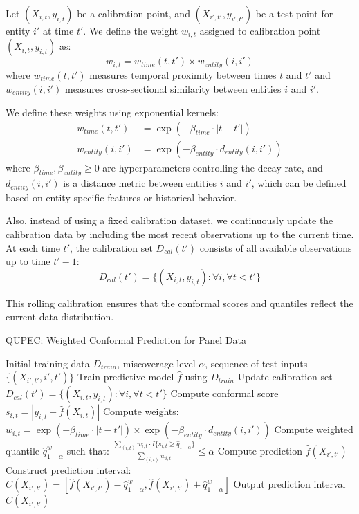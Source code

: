 Let $(X_{i,t}, y_{i,t})$ be a calibration point, and $(X_{i',t'}, y_{i',t'})$ be a test point for entity $i'$ at time $t'$. We define the weight $w_{i,t}$ assigned to calibration point $(X_{i,t}, y_{i,t})$ as:
$$w_{i,t} = w_{time}(t, t') \times w_{entity}(i, i')$$
where $w_{time}(t, t')$ measures temporal proximity between times $t$ and $t'$ and $w_{entity}(i, i')$ measures cross-sectional similarity between entities $i$ and $i'$.

We define these weights using exponential kernels:
\begin{align}
w_{time}(t, t') &= \exp(-\beta_{time} \cdot |t - t'|) \\
w_{entity}(i, i') &= \exp(-\beta_{entity} \cdot d_{entity}(i, i'))
\end{align}
where $\beta_{time}, \beta_{entity} \geq 0$ are hyperparameters controlling the decay rate, and $d_{entity}(i, i')$ is a distance metric between entities $i$ and $i'$, which can be defined based on entity-specific features or historical behavior.

Also, instead of using a fixed calibration dataset, we continuously update the calibration data by including the most recent observations up to the current time. At each time $t'$, the calibration set $D_{cal}(t')$ consists of all available observations up to time $t' - 1$:
$$D_{cal}(t') = \{(X_{i,t}, y_{i,t}) : \forall i, \forall t < t'\}$$

This rolling calibration ensures that the conformal scores and quantiles reflect the current data distribution.

\begin{algorithm}
\caption{QUPEC: Weighted Conformal Prediction for Panel Data}
\begin{algorithmic}[1]
\Require Initial training data $D_{train}$, miscoverage level $\alpha$, sequence of test inputs $\{(X_{i',t'}, i', t')\}$
\State Train predictive model $\hat{f}$ using $D_{train}$
    \State Update calibration set $D_{cal}(t') = \{(X_{i,t}, y_{i,t}) : \forall i, \forall t < t'\}$
        \State Compute conformal score $s_{i,t} = |y_{i,t} - \hat{f}(X_{i,t})|$
        \State Compute weights: $w_{i,t} = \exp(-\beta_{time} \cdot |t - t'|) \times \exp(-\beta_{entity} \cdot d_{entity}(i, i'))$
    \EndFor
    \State Compute weighted quantile $\hat{q}^w_{1-\alpha}$ such that: $\frac{\sum_{(i,t)} w_{i,t} \cdot I\{s_{i,t} \geq \hat{q}_{1-\alpha}\}}{\sum_{(i,t)} w_{i,t}} \leq \alpha$
    \State Compute prediction $\hat{f}(X_{i',t'})$
    \State Construct prediction interval: $C(X_{i',t'}) = [\hat{f}(X_{i',t'}) - \hat{q}^w_{1-\alpha}, \hat{f}(X_{i',t'}) + \hat{q}^w_{1-\alpha}]$
    \State Output prediction interval $C(X_{i',t'})$
\EndFor
\end{algorithmic}
\end{algorithm}


